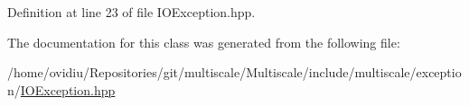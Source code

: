 Definition at line 23 of file I\-O\-Exception.\-hpp.



The documentation for this class was generated from the following file\-:\begin{DoxyCompactItemize}
\item 
/home/ovidiu/\-Repositories/git/multiscale/\-Multiscale/include/multiscale/exception/\hyperlink{IOException_8hpp}{I\-O\-Exception.\-hpp}\end{DoxyCompactItemize}
